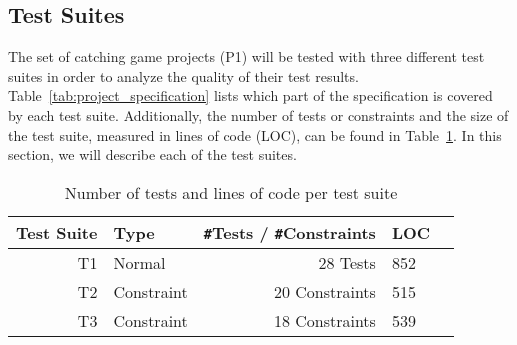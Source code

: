 \subsection{Test Suites}

The set of catching game projects (P1) will be tested with three different test suites
in order to analyze the quality of their test results.
Table~\ref{tab:project_specification} lists which part of the specification is covered by each test suite.
Additionally, the number of tests or constraints and the size of the test suite, measured in lines of code (LOC),
can be found in Table~\ref{tab:test_suite_statistics}.
In this section, we will describe each of the test suites.

\begin{table}[htpb]
    \centering
    \scriptsize
    \begin{tabular}{rlrlr}
        \toprule
        Test Suite & Type       & \texttt{\#}Tests / \texttt{\#}Constraints & LOC \\
        \midrule
        T1         & Normal     & 28 Tests                                  & 852 \\
        T2         & Constraint & 20 Constraints                            & 515 \\
        T3         & Constraint & 18 Constraints                            & 539 \\
        \bottomrule
    \end{tabular}
    \caption{Number of tests and lines of code per test suite}
    \label{tab:test_suite_statistics}
\end{table}

